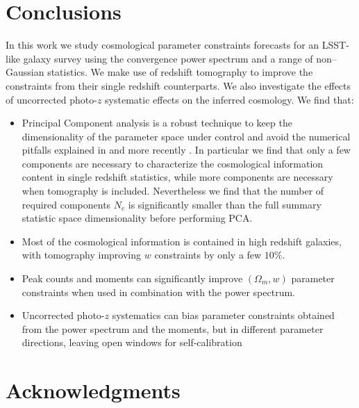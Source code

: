 \documentclass[reprint,aps,prd,superscriptaddress,showkeys,showpacs]{revtex4-1}
\begin{document}

\section{Conclusions}
In this work we study cosmological parameter constraints forecasts for an LSST-like galaxy survey using the convergence power spectrum and a range of non--Gaussian statistics. We make use of redshift tomography to improve the constraints from their single redshift counterparts. We also investigate the effects of uncorrected photo-$z$ systematic effects on the inferred cosmology. We find that:
\begin{itemize}
	\item Principal Component analysis is a robust technique to keep the dimensionality of the parameter space under control and avoid the numerical pitfalls explained in \citep{Taylor12,DodelsonSchneider13,Taylor14} and more recently \citep{PetriVariance}. In particular we find that only a few components are necessary to characterize the cosmological information content in single redshift statistics, while more components are necessary when tomography is included. Nevertheless we find that the number of required components $N_c$ is significantly smaller than the full summary statistic space dimensionality before performing PCA.
	\item Most of the cosmological information is contained in high redshift galaxies, with tomography improving $w$ constraints by only a few $10\%$.   
	\item Peak counts and moments can significantly improve $(\Omega_m,w)$ parameter constraints when used in combination with the power spectrum.
	\item Uncorrected photo-$z$ systematics can bias parameter constraints obtained from the power spectrum and the moments, but in different parameter directions, leaving open windows for self-calibration
\end{itemize}


\section*{Acknowledgments}




\label{lastpage}
\end{document}
